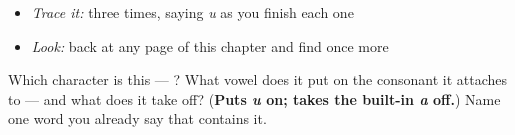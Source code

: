 \begin{quote}
\end{quote}

\begin{itemize}
\raggedright
  \item \emph{Trace it:}  three times, saying \emph{u} as you finish each one
  \item \emph{Look:} back at any page of this chapter and find  once more
\end{itemize}

\begin{tcolorbox}[breakable,colback=teal!4,colframe=teal!35!black,title={Before you move on}]
Which character is this — ? What vowel does it put on the consonant it attaches to — and what does it take off? (\textbf{Puts \emph{u} on; takes the built-in \emph{a} off.}) Name one word you already say that contains it.
\end{tcolorbox}
